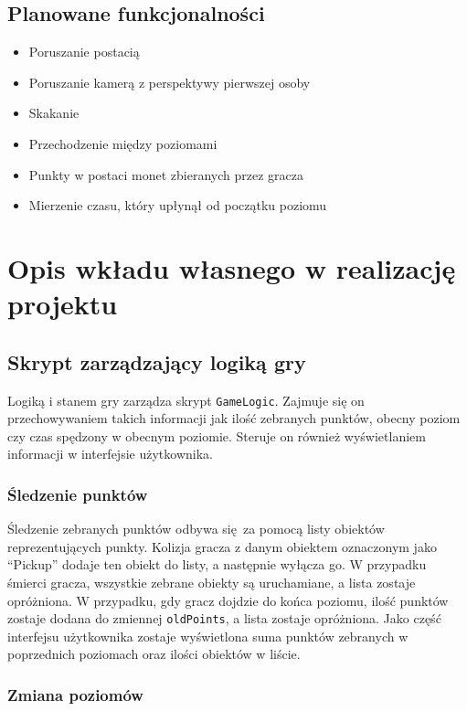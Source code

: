 \documentclass[10pt,a4paper]{article}
\begin{document}
\subsection{Planowane funkcjonalności}

\begin{itemize}
	\item Poruszanie postacią
	\item Poruszanie kamerą z perspektywy pierwszej osoby
	\item Skakanie
	\item Przechodzenie między poziomami
	\item Punkty w postaci monet zbieranych przez gracza
	\item Mierzenie czasu, który upłynął od początku poziomu
\end{itemize}


\section{Opis wkładu własnego w realizację projektu}
\subsection{Skrypt zarządzający logiką gry}

Logiką i stanem gry zarządza skrypt \verb`GameLogic`. Zajmuje się on
przechowywaniem takich informacji jak ilość zebranych punktów, obecny
poziom czy czas spędzony w obecnym poziomie. Steruje on również wyświetlaniem
informacji w interfejsie użytkownika.

% 
\subsubsection{Śledzenie punktów}

Śledzenie zebranych punktów odbywa się za pomocą listy obiektów reprezentujących
punkty. Kolizja gracza z danym obiektem oznaczonym jako ``Pickup'' dodaje ten
obiekt do listy, a następnie wyłącza go. W przypadku śmierci gracza, wszystkie
zebrane obiekty są uruchamiane, a lista zostaje opróżniona. W przypadku, gdy
gracz dojdzie do końca poziomu, ilość punktów zostaje dodana do zmiennej
\verb`oldPoints`, a lista zostaje opróżniona. Jako część interfejsu
użytkownika zostaje wyświetlona suma punktów zebranych w poprzednich poziomach
oraz ilości obiektów w liście.

\subsubsection{Zmiana poziomów}
\end{document}
